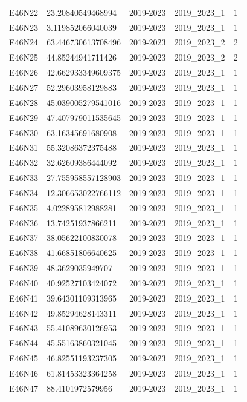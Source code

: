 \begin{landscape}
\begin{longtable}{lllll}
E46N22 & 23.20840549468994 & 2019-2023 & 2019\_2023\_1 & 1 \\
E46N23 & 3.119852066040039 & 2019-2023 & 2019\_2023\_1 & 1 \\
E46N24 & 63.446730613708496 & 2019-2023 & 2019\_2023\_2 & 2 \\
E46N25 & 44.85244941711426 & 2019-2023 & 2019\_2023\_2 & 2 \\
E46N26 & 42.662933349609375 & 2019-2023 & 2019\_2023\_1 & 1 \\
E46N27 & 52.29603958129883 & 2019-2023 & 2019\_2023\_1 & 1 \\
E46N28 & 45.039005279541016 & 2019-2023 & 2019\_2023\_1 & 1 \\
E46N29 & 47.407979011535645 & 2019-2023 & 2019\_2023\_1 & 1 \\
E46N30 & 63.16345691680908 & 2019-2023 & 2019\_2023\_1 & 1 \\
E46N31 & 55.32086372375488 & 2019-2023 & 2019\_2023\_1 & 1 \\
E46N32 & 32.62609386444092 & 2019-2023 & 2019\_2023\_1 & 1 \\
E46N33 & 27.755958557128903 & 2019-2023 & 2019\_2023\_1 & 1 \\
E46N34 & 12.306653022766112 & 2019-2023 & 2019\_2023\_1 & 1 \\
E46N35 & 4.022895812988281 & 2019-2023 & 2019\_2023\_1 & 1 \\
E46N36 & 13.74251937866211 & 2019-2023 & 2019\_2023\_1 & 1 \\
E46N37 & 38.05622100830078 & 2019-2023 & 2019\_2023\_1 & 1 \\
E46N38 & 41.66851806640625 & 2019-2023 & 2019\_2023\_1 & 1 \\
E46N39 & 48.3629035949707 & 2019-2023 & 2019\_2023\_1 & 1 \\
E46N40 & 40.92527103424072 & 2019-2023 & 2019\_2023\_1 & 1 \\
E46N41 & 39.64301109313965 & 2019-2023 & 2019\_2023\_1 & 1 \\
E46N42 & 49.85294628143311 & 2019-2023 & 2019\_2023\_1 & 1 \\
E46N43 & 55.41089630126953 & 2019-2023 & 2019\_2023\_1 & 1 \\
E46N44 & 45.55163860321045 & 2019-2023 & 2019\_2023\_1 & 1 \\
E46N45 & 46.82551193237305 & 2019-2023 & 2019\_2023\_1 & 1 \\
E46N46 & 61.81453323364258 & 2019-2023 & 2019\_2023\_1 & 1 \\
E46N47 & 88.4101972579956 & 2019-2023 & 2019\_2023\_1 & 1 \\

\end{longtable}
\end{landscape}
